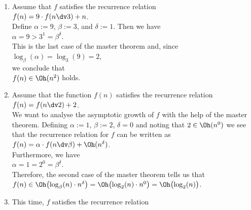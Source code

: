 \examples
\begin{enumerate}
\item Assume that $f$ satisfies the recurrence relation
      \\[0.2cm]
      \hspace*{1.3cm}
      $f(n) = 9 \cdot f(n \dv 3) + n$.
      \\[0.2cm] 
      Define $\alpha := 9$, $\beta := 3$, and $\delta := 1$.
      Then we have
      \\[0.2cm]
      \hspace*{1.3cm}
      $\alpha = 9 > 3^1 = \beta^\delta$.
      \\[0.2cm] 
      This is the last case of the master theorem and, since 
      \\[0.2cm]
      \hspace*{1.3cm}
      $\log_{\beta}(\alpha) = \log_3(9) = 2$,
      \\[0.2cm]
      we conclude that
      \\[0.2cm]
      \hspace*{1.3cm}
      $f(n) \in \Oh(n^2)$ \quad holds.
\item Assume that the function $f(n)$ satisfies the recurrence relation
      \\[0.2cm]
      \hspace*{1.3cm}
      $f(n) = f(n \dv 2) + 2$.
      \\[0.2cm]
      We want to analyse the asymptotic growth of $f$ with the help of the master theorem.
      Defining $\alpha := 1$, $\beta := 2$,  $\delta = 0$ and noting that $2 \in \Oh(n^0)$ we see that
      the recurrence relation for $f$ can be written as
      \\[0.2cm]
      \hspace*{1.3cm}
      $f(n) = \alpha \cdot f(n \dv \beta) + \Oh(n^\delta)$.
      \\[0.2cm]
      Furthermore, we have
      \\[0.2cm]
      \hspace*{1.3cm}
      $\alpha = 1 = 2^0 = \beta^\delta$.
      \\[0.2cm]
      Therefore, the second case of the master theorem tells us that
      \\[0.2cm]
      \hspace*{1.3cm}
      $f(n) \in \Oh\bigl(\log_\beta(n) \cdot n^\delta\bigr) = \Oh\bigl(\log_2(n) \cdot n^0\bigr) = \Oh\bigl(\log_2(n)\bigr)$.
\item This time, $f$ satisfies the recurrence relation 
      \\[0.2cm]

\end{enumerate}
